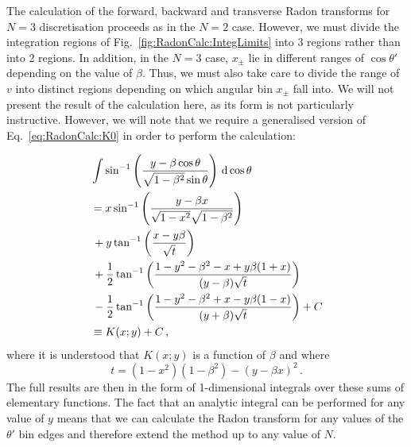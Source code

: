 The calculation of the forward, backward and transverse Radon transforms for $N=3$ discretisation proceeds as in the $N=2$ case. However, we must divide the integration regions of Fig.~\ref{fig:RadonCalc:IntegLimits} into 3 regions rather than into 2 regions. In addition, in the $N=3$ case, $x_\pm$ lie in different ranges of $\cos\theta'$ depending on the value of $\beta$. Thus, we must also take care to divide the range of $v$ into distinct regions depending on which angular bin $x_\pm$ fall into. We will not present the result of the calculation here, as its form is not particularly instructive. However, we will note that we require a generalised version of Eq.~\ref{eq:RadonCalc:K0} in order to perform the calculation:

\begin{align}
&\int \sin^{-1}\left(\frac{y -\beta\cos\theta}{\sqrt{1-\beta^2}\sin\theta}\right) \,\mathrm{d}\cos\theta \notag\\
&= x \sin^{-1}\left(\frac{y-\beta x}{\sqrt{1-x^2}\sqrt{1-\beta^2}}\right) \notag\\
&\, + y \tan^{-1}\left(\frac{x-y\beta}{\sqrt{t}}\right) \notag\\
&\, + \frac{1}{2} \tan^{-1}\left(\frac{1 - y^2 - \beta^2 - x + y\beta(1+x)}{(y-\beta) \sqrt{t}}\right) \notag\\
&\, - \frac{1}{2} \tan^{-1}\left(\frac{1 - y^2 - \beta^2 + x - y\beta(1-x)}{(y+\beta) \sqrt{t}}\right) + C \notag\\
&\equiv K(x;y) + C\,,
\end{align}
where it is understood that $K(x;y)$ is a function of $\beta$ and where
\begin{equation}
t = (1-x^2)(1-\beta^2) - (y - \beta x)^2\,.
\end{equation}
The full results are then in the form of 1-dimensional integrals over these sums of elementary functions. The fact that an analytic integral can be performed for any value of $y$ means that we can calculate the Radon transform for any values of the $\theta'$ bin edges and therefore extend the method up to any value of $N$. 

